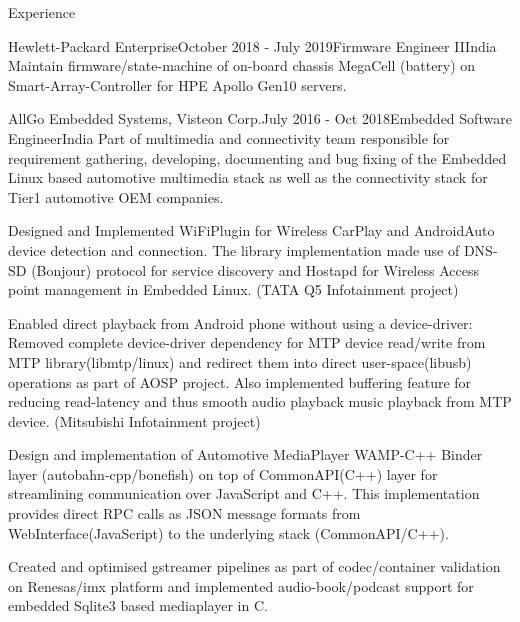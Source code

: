 \documentclass[
	a4paper, %
	11pt, %
]{resume} %
\begin{document}
\begin{rSection}{Experience}
\begin{rSubsection}{Hewlett-Packard Enterprise}{October 2018 - July 2019}{Firmware Engineer II}{India}
            Maintain firmware/state-machine of on-board chassis MegaCell (battery) on Smart-Array-Controller for HPE
Apollo Gen10 servers.


	\end{rSubsection}

	\begin{rSubsection}{AllGo Embedded Systems, Visteon Corp.}{July 2016 - Oct 2018}{Embedded Software Engineer}{India}
            Part of multimedia and connectivity team responsible for requirement gathering, developing, documenting and bug fixing of the Embedded Linux based automotive multimedia stack as well as the connectivity stack for Tier1 automotive OEM companies.

            Designed and Implemented WiFiPlugin for Wireless CarPlay and AndroidAuto device detection and connection. The library implementation made use of DNS-SD (Bonjour) protocol for service discovery and Hostapd for Wireless Access point management in Embedded Linux. (TATA Q5 Infotainment project) \hfill
            
            Enabled direct playback from Android phone without using a device-driver: Removed complete device-driver dependency for MTP device read/write from MTP library(libmtp/linux) and redirect them into direct user-space(libusb) operations as part of AOSP project. Also implemented buffering feature for reducing read-latency and thus smooth audio playback music playback from MTP device. (Mitsubishi Infotainment project) \hfill

            Design and implementation of Automotive MediaPlayer WAMP-C++ Binder layer (autobahn-cpp/bonefish) on top of CommonAPI(C++) layer for streamlining communication over JavaScript and C++. This implementation provides direct RPC calls as JSON message formats from WebInterface(JavaScript) to the underlying stack (CommonAPI/C++).

            Created and optimised gstreamer pipelines as part of codec/container validation on Renesas/imx platform and implemented audio-book/podcast support for embedded Sqlite3 based mediaplayer in C.

	\end{rSubsection}


\end{rSection}
\end{document}
